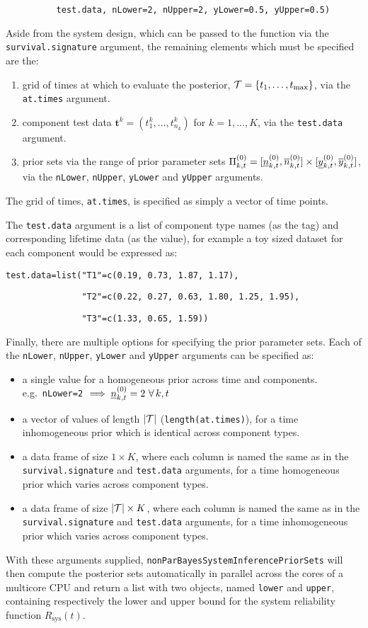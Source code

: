 \documentclass[12pt, a4paper]{elsarticle}
\newcommand{\bs}[1]{\boldsymbol{#1}}
\renewcommand{\vec}[1]{{\bs#1}}
\newcommand{\Rsys}{R_\text{sys}}
\def\tmax{t_\text{max}}
\begin{document}
\noindent\texttt{~~~~~~~~~~test.data, nLower=2, nUpper=2, yLower=0.5, yUpper=0.5)}

Aside from the system design, which can be passed to the function via
the \texttt{survival.signature} argument, the remaining elements which
must be specified are the:
\begin{enumerate}
  \item grid of times at which to evaluate the posterior, ${\cal T} = \{t_1, \ldots, \tmax\}$, via the \texttt{at.times} argument.
  \item component test data $\vec{t}^k = (t^k_1, \ldots, t^k_{n_k})$ for $k=1,\dots,K$, via the \texttt{test.data} argument.
  \item prior sets via the range of prior parameter sets $\Pi^{(0)}_{k,t} = [\underline{n}^{(0)}_{k,t}, \overline{n}^{(0)}_{k,t}] \times [\underline{y}^{(0)}_{k,t}, \overline{y}^{(0)}_{k,t}]$, via the \texttt{nLower}, \texttt{nUpper}, \texttt{yLower} and \texttt{yUpper} arguments.
\end{enumerate}

The grid of times, \texttt{at.times}, is specified as simply a vector 
of time points.

The \texttt{test.data} argument is a list of component type names (as
the tag) and corresponding lifetime data (as the value), for example 
a toy sized dataset for each component would be expressed as:

\noindent\texttt{test.data=list("T1"=c(0.19, 0.73, 1.87, 1.17),}

\noindent\texttt{~~~~~~~~~~~~~~~"T2"=c(0.22, 0.27, 0.63, 1.80, 1.25, 1.95),}

\noindent\texttt{~~~~~~~~~~~~~~~"T3"=c(1.33, 0.65, 1.59))}

Finally, there are multiple options for specifying the prior parameter
sets.  Each of the \texttt{nLower}, \texttt{nUpper}, \texttt{yLower}
and \texttt{yUpper} arguments can be specified as:
\begin{itemize}
  \item a single value for a homogeneous prior across time and components.  e.g.\ \texttt{nLower=2} $\implies \underline{n}^{(0)}_{k,t}=2 \ \forall\,k, t$
  \item a vector of values of length $|{\cal T}|$ (\texttt{length(at.times)}), for a time inhomogeneous prior which is identical across component types.
  \item a data frame of size $1\times K$, where each column is named the same as in the \texttt{survival.signature} and \texttt{test.data} arguments, for a time homogeneous prior which varies across component types.
  \item a data frame of size $|{\cal T}|\times K$, where each column is named the same as in the \texttt{survival.signature} and \texttt{test.data} arguments, for a time inhomogeneous prior which varies across component types.
\end{itemize}

With these arguments supplied,  \texttt{nonParBayesSystemInferencePriorSets} will then compute
the posterior sets automatically in parallel across the cores of a
multicore CPU and return a list with two objects, named \texttt{lower} 
and \texttt{upper}, containing respectively the lower and upper bound 
for the system reliability function $\Rsys(t)$.
\end{document}
